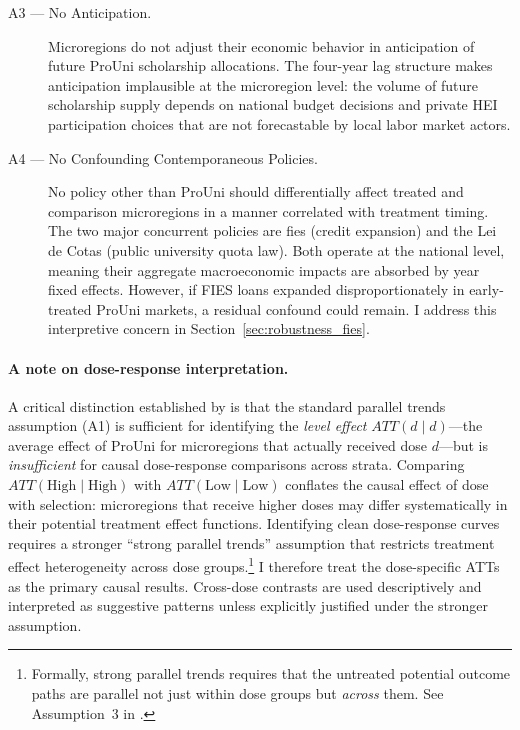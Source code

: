 \begin{description}
\item[A3 --- No Anticipation.]
Microregions do not adjust their economic behavior in anticipation of future ProUni scholarship allocations. The four-year lag structure makes anticipation implausible at the microregion level: the volume of future scholarship supply depends on national budget decisions and private HEI participation choices that are not forecastable by local labor market actors.

\item[A4 --- No Confounding Contemporaneous Policies.]
No policy other than ProUni should differentially affect treated and comparison microregions in a manner correlated with treatment timing. The two major concurrent policies are \acrshort{fies} (credit expansion) and the Lei de Cotas (public university quota law). Both operate at the national level, meaning their aggregate macroeconomic impacts are absorbed by year fixed effects. However, if FIES loans expanded disproportionately in early-treated ProUni markets, a residual confound could remain. I address this interpretive concern in Section~\ref{sec:robustness_fies}.

\end{description}

\paragraph{A note on dose-response interpretation.}
A critical distinction established by  is that the standard parallel trends assumption (A1) is sufficient for identifying the \emph{level effect} $ATT(d \mid d)$---the average effect of ProUni for microregions that actually received dose $d$---but is \emph{insufficient} for causal dose-response comparisons across strata. Comparing $ATT(\text{High} \mid \text{High})$ with $ATT(\text{Low} \mid \text{Low})$ conflates the causal effect of dose with selection: microregions that receive higher doses may differ systematically in their potential treatment effect functions. Identifying clean dose-response curves requires a stronger ``strong parallel trends'' assumption that restricts treatment effect heterogeneity across dose groups.\footnote{Formally, strong parallel trends requires that the untreated potential outcome paths are parallel not just within dose groups but \emph{across} them. See Assumption~3 in .} I therefore treat the dose-specific ATTs as the primary causal results. Cross-dose contrasts are used descriptively and interpreted as suggestive patterns unless explicitly justified under the stronger assumption.


